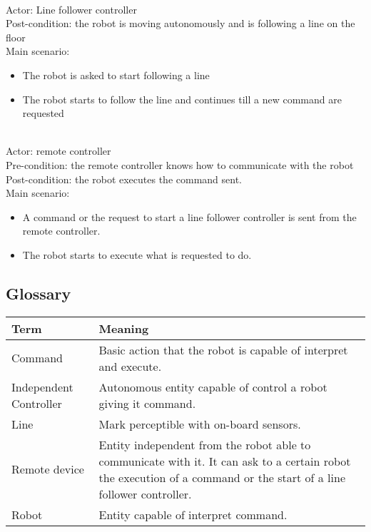 \documentclass{llncs}
\begin{document}
\\
Actor: Line follower controller\\
Post-condition: the robot is moving autonomously and is following a line on the floor\\
Main scenario:
\begin{itemize}
	\item The robot is asked to start following a line
	\item The robot starts to follow the line and continues till a new command are requested
\end{itemize}

\\
Actor: remote controller\\
Pre-condition: the remote controller knows how to communicate with the robot\\
Post-condition: the robot executes the command sent.\\
Main scenario:
\begin{itemize}
	\item A command or the request to start a line follower controller is sent from the remote controller.
	\item The robot starts to execute what is requested to do.
\end{itemize}
 



\subsection{Glossary}
\begin{center}
	\begin{tabular}{| p{} | p{}|}
		\hline
 		\textbf{Term }         &  \textbf{Meaning}   \\
		\hline
		Command &Basic action that the robot is capable of interpret and execute. \\
		\hline
		Independent Controller &Autonomous entity capable of control a robot giving it command. \\
		\hline 
		Line  &Mark perceptible with on-board sensors. \\
		\hline
		Remote device  &Entity independent from the robot able to communicate with it. It can ask to a certain robot the execution of a command or the start of a line follower controller. \\
		\hline
		Robot   &Entity capable of interpret command. \\
		\hline
	\end{tabular}
\end{center}
\end{document}
